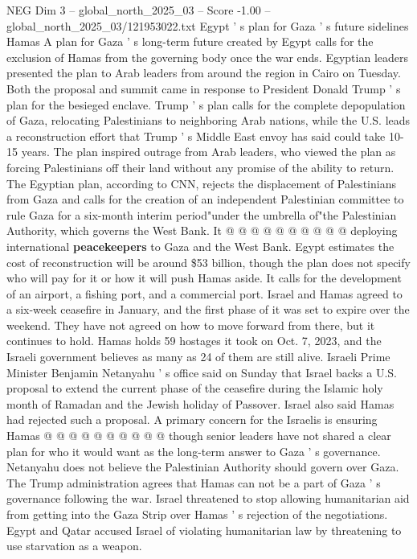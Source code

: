 \begin{textsample}{NEG Dim 3 – global\_north\_2025\_03 – Score -1.00 – global\_north\_2025\_03/121953022.txt}  \label{ex:f3_neg_435}
Egypt ' s plan for Gaza ' s future sidelines Hamas A plan for Gaza ' s long-term future created by Egypt calls for the exclusion of Hamas from the governing body once the war ends.
Egyptian leaders presented the plan to Arab leaders from around the region in Cairo on Tuesday.
Both the proposal and summit came in response to President Donald Trump ' s plan for the besieged enclave.
Trump ' s plan calls for the complete depopulation of Gaza, relocating Palestinians to neighboring Arab nations, while the U.S. leads a reconstruction effort that Trump ' s Middle East envoy has said could take 10-15 years.
The plan inspired outrage from Arab leaders, who viewed the plan as forcing Palestinians off their land without any promise of the ability to return.
The Egyptian plan, according to CNN, rejects the displacement of Palestinians from Gaza and calls for the creation of an independent Palestinian committee to rule Gaza for a six-month interim period"under the umbrella of"the Palestinian Authority, which governs the West Bank.
It @ @ @ @ @ @ @ @ @ @ deploying international \textbf{peacekeepers} to Gaza and the West Bank.
Egypt estimates the cost of reconstruction will be around \$53 billion, though the plan does not specify who will pay for it or how it will push Hamas aside.
It calls for the development of an airport, a fishing port, and a commercial port.
Israel and Hamas agreed to a six-week ceasefire in January, and the first phase of it was set to expire over the weekend.
They have not agreed on how to move forward from there, but it continues to hold.
Hamas holds 59 hostages it took on Oct. 7, 2023, and the Israeli government believes as many as 24 of them are still alive.
Israeli Prime Minister Benjamin Netanyahu ' s office said on Sunday that Israel backs a U.S. proposal to extend the current phase of the ceasefire during the Islamic holy month of Ramadan and the Jewish holiday of Passover.
Israel also said Hamas had rejected such a proposal.
A primary concern for the Israelis is ensuring Hamas @ @ @ @ @ @ @ @ @ @ though senior leaders have not shared a clear plan for who it would want as the long-term answer to Gaza ' s governance.
Netanyahu does not believe the Palestinian Authority should govern over Gaza.
The Trump administration agrees that Hamas can not be a part of Gaza ' s governance following the war.
Israel threatened to stop allowing humanitarian aid from getting into the Gaza Strip over Hamas ' s rejection of the negotiations.
Egypt and Qatar accused Israel of violating humanitarian law by threatening to use starvation as a weapon.

\end{textsample}
